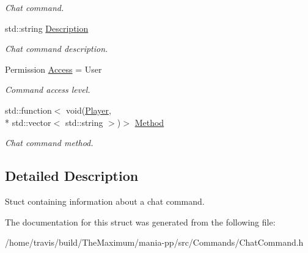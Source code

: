 \begin{DoxyCompactItemize}
\begin{DoxyCompactList}\small\item\em Chat command. \end{DoxyCompactList}\item 
\hypertarget{structChatCommand_add2fe44a7c9b7b07982dce3ca848ab53}{std\-::string \hyperlink{structChatCommand_add2fe44a7c9b7b07982dce3ca848ab53}{Description}}\label{structChatCommand_add2fe44a7c9b7b07982dce3ca848ab53}

\begin{DoxyCompactList}\small\item\em Chat command description. \end{DoxyCompactList}\item 
\hypertarget{structChatCommand_a764a13ea83d62da0489d7d9a30f16069}{Permission \hyperlink{structChatCommand_a764a13ea83d62da0489d7d9a30f16069}{Access} = User}\label{structChatCommand_a764a13ea83d62da0489d7d9a30f16069}

\begin{DoxyCompactList}\small\item\em Command access level. \end{DoxyCompactList}\item 
\hypertarget{structChatCommand_a288ccc66531286af1103bd2a83c09ec5}{std\-::function$<$ void(\hyperlink{structPlayer}{Player}, \\*
std\-::vector$<$ std\-::string $>$)$>$ \hyperlink{structChatCommand_a288ccc66531286af1103bd2a83c09ec5}{Method}}\label{structChatCommand_a288ccc66531286af1103bd2a83c09ec5}

\begin{DoxyCompactList}\small\item\em Chat command method. \end{DoxyCompactList}\end{DoxyCompactItemize}


\subsection{Detailed Description}
Stuct containing information about a chat command. 

The documentation for this struct was generated from the following file\-:\begin{DoxyCompactItemize}
\item 
/home/travis/build/\-The\-Maximum/mania-\/pp/src/\-Commands/Chat\-Command.\-h\end{DoxyCompactItemize}
